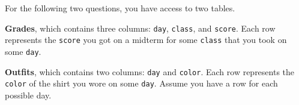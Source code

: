 For the following two questions, you have access to two tables.

\textbf{Grades}, which contains three columns: \lstinline{day}, \lstinline{class}, and \lstinline{score}. Each row represents the \lstinline{score} you got on a midterm for some \lstinline{class} that you took on some \lstinline{day}.

\textbf{Outfits}, which contains two columns: \lstinline{day} and \lstinline{color}. Each row represents the \lstinline{color} of the shirt you wore on some \lstinline{day}. Assume you have a row for each possible day.

